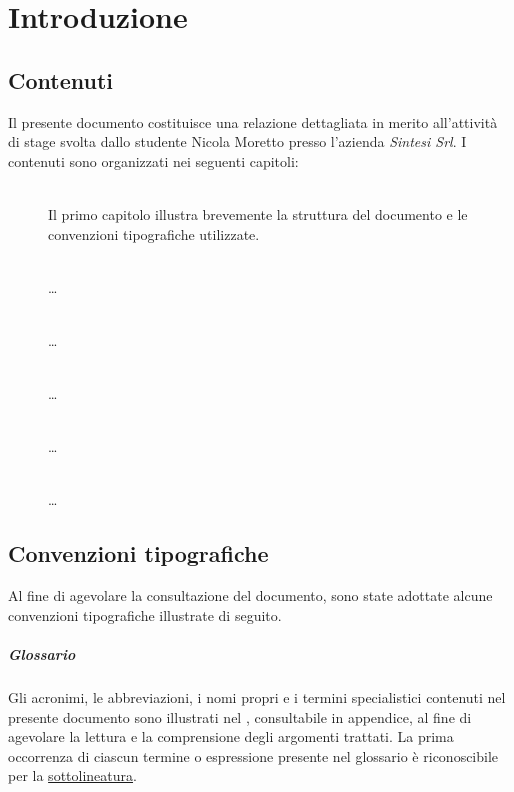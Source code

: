 \chapter{Introduzione}
\label{ch:tesi:intro}

\section{Contenuti}
Il presente documento costituisce una relazione dettagliata in merito all'attività di stage svolta dallo studente Nicola Moretto presso l'azienda \textit{Sintesi Srl}. I contenuti sono organizzati nei seguenti capitoli:
\begin{description}
  \item[] \hfill \\
  Il primo capitolo illustra brevemente la struttura del documento e le convenzioni tipografiche utilizzate.
  \item[] \hfill \\
  \ldots
  \item[] \hfill \\
  \ldots
  \item[] \hfill \\
  \ldots
  \item[] \hfill \\
  \ldots
  \item[] \hfill \\
  \ldots
\end{description}

\section{Convenzioni tipografiche}
Al fine di agevolare la consultazione del documento, sono state adottate alcune convenzioni tipografiche illustrate di seguito.

\paragraph{Glossario} Gli acronimi, le abbreviazioni, i nomi propri e i termini specialistici contenuti nel presente documento sono illustrati nel \textit{}, consultabile in appendice, al fine di agevolare la lettura e la comprensione degli argomenti trattati.	La prima occorrenza di ciascun termine o espressione presente nel glossario è riconoscibile per la \underline{sottolineatura}.

